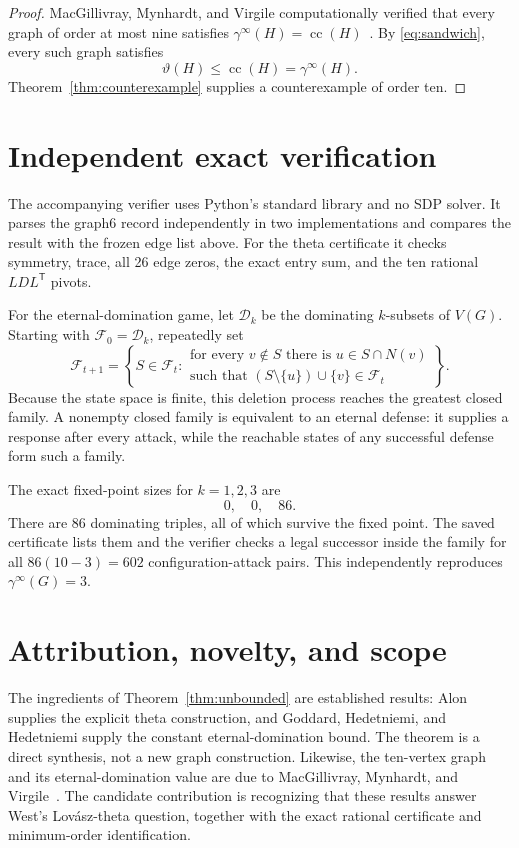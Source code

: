 \documentclass[11pt]{article}
\newcommand{\cc}{\operatorname{cc}}
\begin{document}
\begin{proof}
MacGillivray, Mynhardt, and Virgile computationally verified that every graph
of order at most nine satisfies
\(\gamma^\infty(H)=\cc(H)\)~\cite[Proposition~5.2]{mmv}.  By
\eqref{eq:sandwich}, every such graph satisfies
\[
 \vartheta(H)\leq\cc(H)=\gamma^\infty(H).
\]
Theorem~\ref{thm:counterexample} supplies a counterexample of order ten.
\end{proof}

\section{Independent exact verification}\label{sec:verification}

The accompanying verifier uses Python's standard library and no SDP solver.
It parses the graph6 record independently in two implementations and compares
the result with the frozen edge list above.  For the theta certificate it
checks symmetry, trace, all 26 edge zeros, the exact entry sum, and the ten
rational \(LDL^{\mathsf T}\) pivots.

For the eternal-domination game, let \(\mathcal D_k\) be the dominating
\(k\)-subsets of \(V(G)\).  Starting with
\(\mathcal F_0=\mathcal D_k\), repeatedly set
\[
\mathcal F_{t+1}=
\left\{S\in\mathcal F_t:
\begin{array}{l}
\text{for every }v\notin S\text{ there is }u\in S\cap N(v)\\
\text{such that }(S\setminus\{u\})\cup\{v\}\in\mathcal F_t
\end{array}
\right\}.
\]
Because the state space is finite, this deletion process reaches the greatest
closed family.  A nonempty closed family is equivalent to an eternal defense:
it supplies a response after every attack, while the reachable states of any
successful defense form such a family.

The exact fixed-point sizes for \(k=1,2,3\) are
\[
 0,\quad 0,\quad 86.
\]
There are 86 dominating triples, all of which survive the fixed point.
The saved certificate lists them and the verifier checks a legal successor
inside the family for all \(86(10-3)=602\) configuration-attack pairs.  This
independently reproduces \(\gamma^\infty(G)=3\).

\section{Attribution, novelty, and scope}

The ingredients of Theorem~\ref{thm:unbounded} are established results:
Alon supplies the explicit theta construction, and Goddard, Hedetniemi, and
Hedetniemi supply the constant eternal-domination bound.  The theorem is a
direct synthesis, not a new graph construction.  Likewise, the ten-vertex
graph and its eternal-domination value are due to MacGillivray, Mynhardt, and
Virgile~\cite{mmv}.  The candidate contribution is recognizing that these
results answer West's Lov\'asz-theta question, together with the exact
rational certificate and minimum-order identification.
\end{document}
